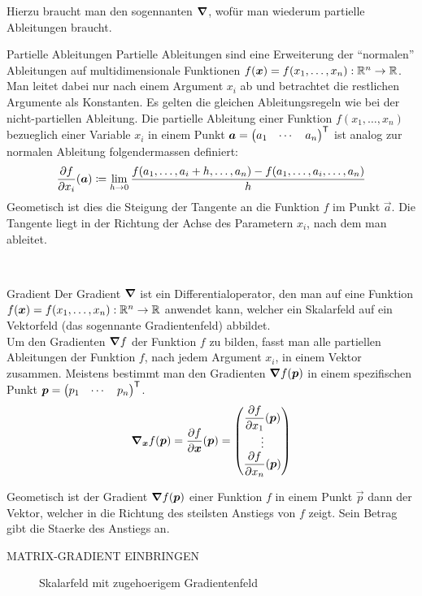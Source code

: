 Hierzu braucht man den sogennanten  $\bm{\nabla}$, wofür man wiederum partielle Ableitungen braucht.
\para{}
\begin{defbox}{Partielle Ableitungen}\label{ref:partielle_ableitungen}
  Partielle Ableitungen sind eine Erweiterung der ``normalen'' Ableitungen auf
  multidimensionale Funktionen $f(\bm{x}) = f(x_1,\ldots,x_n): \mathbb{R}^n \to \mathbb{R}$.
  Man leitet dabei nur nach einem Argument $x_i$ ab und betrachtet die restlichen Argumente als Konstanten.
  Es gelten die gleichen Ableitungsregeln wie bei der nicht-partiellen Ableitung.
  Die partielle Ableitung einer Funktion $f(x_1,\ldots,x_n)$ bezueglich einer
  Variable $x_i$ in einem Punkt $\bm{a} = \begin{pmatrix} a_1 & \cdots & a_n \end{pmatrix}^{\mathsf{T}}$
  ist analog zur normalen Ableitung folgendermassen definiert:
  \begin{equation*}
    \frac{\partial f}{\partial x_i}(\bm{a}) \coloneqq \lim_{h \to 0} \frac{f(a_1,\ldots,a_i + h,\ldots,a_n)-f(a_1,\ldots,a_i,\ldots,a_n)}{h}
  \end{equation*}
  Geometisch ist dies die Steigung der Tangente an die Funktion $f$ im Punkt
  $\vec{a}$. Die Tangente liegt in der Richtung der Achse des Parametern $x_i$, nach dem man ableitet.
\end{defbox}
\\
\begin{defbox}{Gradient}
  Der Gradient $\bm{\nabla}$ ist ein Differentialoperator, den man auf eine
  Funktion $f(\bm{x}) = f(x_1,\ldots,x_n): \mathbb{R}^n \to \mathbb{R}$ anwendet kann, welcher ein Skalarfeld auf ein Vektorfeld (das sogennante Gradientenfeld) abbildet.\\
  Um den Gradienten $\bm{\nabla}f$ der Funktion $f$ zu bilden, fasst man alle partiellen Ableitungen der Funktion $f$, nach jedem
  Argument $x_i$, in einem Vektor zusammen. Meistens bestimmt man den Gradienten
  $\bm{\nabla} f(\bm{p})$ in einem spezifischen Punkt $\bm{p} =
  \begin{pmatrix} p_1 & \cdots & p_n \end{pmatrix}^{\mathsf{T}}$.
  \begin{equation*}
    \bm{\nabla}_{\bm{x}} f(\bm{p}) = \displaystyle\frac{\partial f}{\partial \bm{x}}(\bm{p}) =
    \begin{pmatrix}
      \displaystyle\frac{\partial f}{\partial x_1}(\bm{p}) \\
      \vdots \\
      \displaystyle\frac{\partial f}{\partial x_n}(\bm{p}) \\
    \end{pmatrix}
  \end{equation*}

  Geometisch ist der Gradient $\bm{\nabla}f(\bm{p})$ einer Funktion $f$ in einem Punkt $\vec{p}$ dann der Vektor, welcher in die Richtung des steilsten Anstiegs von $f$ zeigt.
  Sein Betrag gibt die Staerke des Anstiegs an.

  MATRIX-GRADIENT EINBRINGEN
\end{defbox}
\para{}
\begin{figure}[h!]
  \caption{Skalarfeld mit zugehoerigem Gradientenfeld}
\end{figure}

